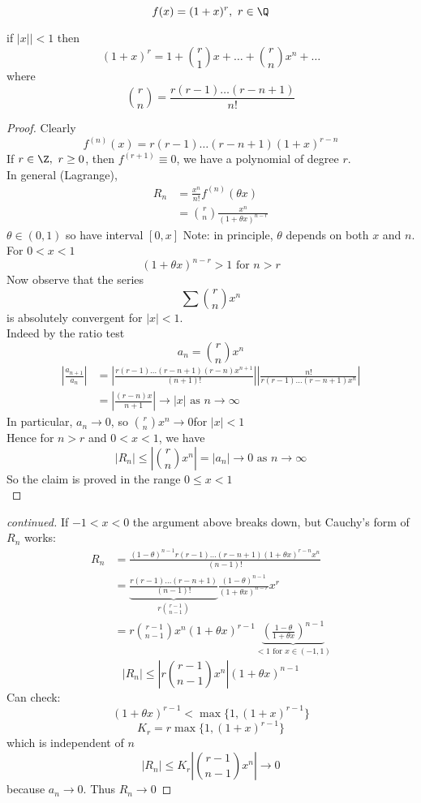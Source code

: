 \begin{example}
\[f(x) = (1+x)^r, \ r\in \Q\]
\begin{claim}
if $|x||<1$ then
\[(1+x)^r = 1 + \binom{r}{1}x + \dots + \binom{r}{n}x^n + \dots\]
where
\[\binom{r}{n} = \frac{r(r-1)\dots(r-n+1)}{n!}\]
\end{claim}
\begin{proof}
Clearly
\[f^{(n)}(x) = r(r-1)\dots(r-n+1)(1+x)^{r-n}\]
If $r\in \Z,\ r\geq 0$, then $f^{(r+1)} \equiv 0$, we have a polynomial of degree $r$.\\
In general (Lagrange),
\begin{align*}
    R_n &= \frac{x^n}{n!}f^{(n)}(\theta x)\\
    &=\binom{r}{n}\frac{x^n}{(1+\theta x)^{n-r}}
\end{align*}
$\theta\in(0,1)$ so have interval $[0,x]$
Note: in principle, $\theta$ depends on both $x$ and $n$.\\
For $0<x<1$
\[(1+\theta x)^{n-r}>1\text{ for }n>r\]
Now observe that the series
\[\sum \binom{r}{n}x^n\]
is absolutely convergent for $|x| < 1$.\\
Indeed by the ratio test
\[a_n = \binom{r}{n}x^n\]
\begin{align}
    \left|\frac{a_{n+1}}{a_n}\right| &= \left|\frac{r(r-1)\dots(r-n+1)(r-n)x^{n+1}}{(n+1)!}\right|\left|\frac{n!}{r(r-1)\dots(r-n+1)x^n}\right|\\
    &= \left| \frac{(r-n)x}{n+1}\right|\to |x|\text{ as }n\to \infty
\end{align}
In particular, $a_n\to 0$, so $\binom{r}{n}x^n \to 0$for $|x|<1$\\
Hence for $n>r$ and $0<x<1$, we have
\[|R_n|\leq \left|\binom{r}{n}x^n\right| = |a_n|\to 0\text{ as }n\to \infty\]
So the claim is proved in the range $0\leq x<1$\\
\end{proof}
\end{example}
\begin{example}[continued]
\hfill{ }
\begin{proof}[continued]
If $-1<x<0$ the argument above breaks down, but Cauchy's form of $R_n$ works:
\begin{align*}
    R_n &= \frac{(1-\theta)^{n-1}r(r-1)\dots(r-n+1)(1+\theta x)^{r-n}x^n}{(n-1)!}\\
&= \underbrace{\frac{r(r-1)\dots(r-n+1)}{(n-1)!}}_{r\binom{r-1}{n-1}} \frac{(1-\theta)^{n-1}}{(1+\theta x)^{n-r}}x^r\\
&=r\binom{r-1}{n-1}x^n(1+\theta x)^{r-1}\underbrace{\left(\frac{1-\theta}{1+\theta x}\right)^{n-1}}_{<1 \text{ for }x\in (-1,1)}
\end{align*}
\[|R_n|\leq\left|r\binom{r-1}{n-1}x^n\right|(1+\theta x)^{n-1}\]
Can check:
\[(1+\theta x)^{r-1} < \max\{1,(1+x)^{r-1}\}\]
\[K_r = r\max\{1,(1+x)^{r-1}\}\]
which is independent of $n$
\[|R_n|\leq K_r\left|\binom{r-1}{n-1}x^n\right|\to 0\]
because $a_n\to 0$. Thus $R_n\to 0$
\end{proof}
\end{example}
